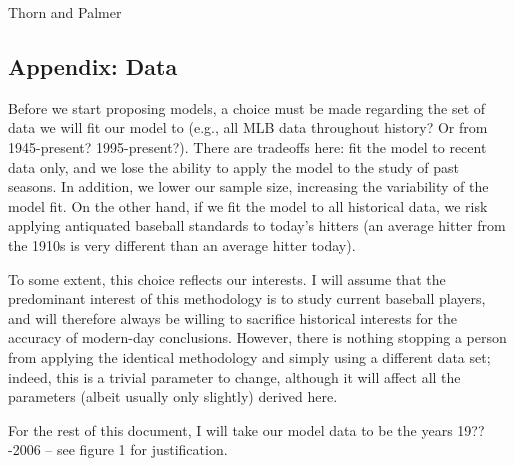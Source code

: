 \documentclass[a4paper,twoside,12pt]{article}
\begin{document}
\begin{thebibliography}{9}
 Thorn and Palmer
\end{thebibliography}

\subsection*{Appendix: Data}
Before we start proposing models, a choice must be made regarding the set of data we will fit our model to (e.g., all MLB data throughout history?  Or from 1945-present?  1995-present?).  There are tradeoffs here: fit the model to recent data only, and we lose the ability to apply the model to the study of past seasons.  In addition, we lower our sample size, increasing the variability of the model fit.  On the other hand, if we fit the model to all historical data, we risk applying antiquated baseball standards to today's hitters (an average hitter from the 1910s is very different than an average hitter today).

To some extent, this choice reflects our interests.  I will assume that the predominant interest of this methodology is to study current baseball players, and will therefore always be willing to sacrifice historical interests for the accuracy of modern-day conclusions.  However, there is nothing stopping a person from applying the identical methodology and simply using a different data set; indeed, this is a trivial parameter to change, although it will affect all the parameters (albeit usually only slightly) derived here.

For the rest of this document, I will take our model data to be the years 19??-2006 -- see figure 1 for justification.
\end{document}
